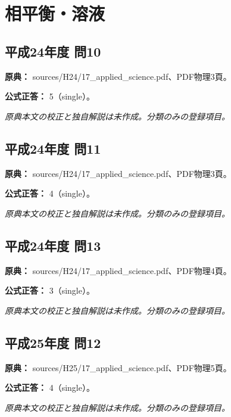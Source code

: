 \section{相平衡・溶液}

\subsection{平成24年度 問10}
\label{q:h24-reg-applied-10}

\noindent\textbf{原典：} sources/H24/17\_applied\_science.pdf、PDF物理3頁。

\textbf{公式正答：} 5（single）。

\par\textit{原典本文の校正と独自解説は未作成。分類のみの登録項目。}

\subsection{平成24年度 問11}
\label{q:h24-reg-applied-11}

\noindent\textbf{原典：} sources/H24/17\_applied\_science.pdf、PDF物理3頁。

\textbf{公式正答：} 4（single）。

\par\textit{原典本文の校正と独自解説は未作成。分類のみの登録項目。}

\subsection{平成24年度 問13}
\label{q:h24-reg-applied-13}

\noindent\textbf{原典：} sources/H24/17\_applied\_science.pdf、PDF物理4頁。

\textbf{公式正答：} 3（single）。

\par\textit{原典本文の校正と独自解説は未作成。分類のみの登録項目。}

\subsection{平成25年度 問12}
\label{q:h25-reg-applied-12}

\noindent\textbf{原典：} sources/H25/17\_applied\_science.pdf、PDF物理5頁。

\textbf{公式正答：} 4（single）。

\par\textit{原典本文の校正と独自解説は未作成。分類のみの登録項目。}


